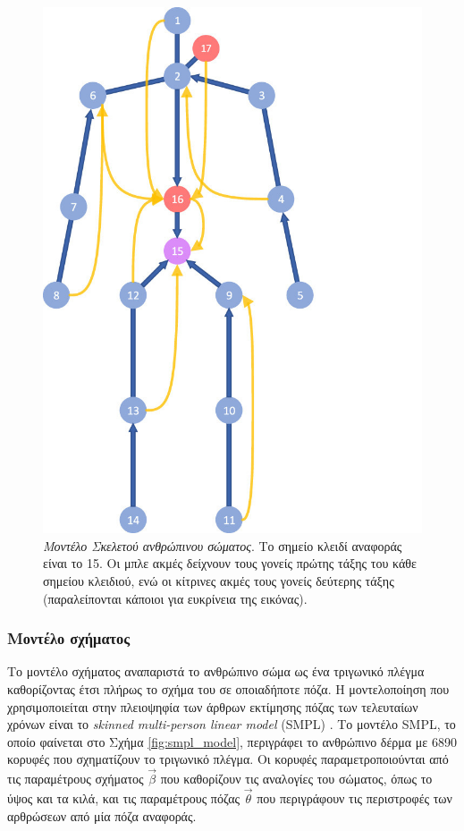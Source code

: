 \begin{figure}[h]
    \centering
    \includegraphics[scale=1.5]{images/chapter2/3d_pose_estimation/skeleton_human_model.jpg}
    \caption[Μοντέλο Σκελετού]{\textsl{Μοντέλο Σκελετού ανθρώπινου σώματος}. Το σημείο κλειδί αναφοράς είναι το 15. Οι μπλε ακμές δείχνουν τους γονείς πρώτης τάξης του κάθε σημείου κλειδιού, ενώ οι κίτρινες ακμές τους γονείς δεύτερης τάξης (παραλείπονται κάποιοι για ευκρίνεια της εικόνας).}
    \label{fig:skeleton_model}
\end{figure}
    
\subsubsection{Μοντέλο σχήματος}
Το μοντέλο σχήματος αναπαριστά το ανθρώπινο σώμα ως ένα τριγωνικό πλέγμα καθορίζοντας έτσι πλήρως το σχήμα του σε οποιαδήποτε πόζα. Η μοντελοποίηση που χρησιμοποιείται στην πλειοψηφία των άρθρων εκτίμησης πόζας των τελευταίων χρόνων είναι το \textsl{skinned multi-person linear model} (SMPL) \cite{smpl_paper}. Το μοντέλο SMPL, το οποίο φαίνεται στο Σχήμα \ref{fig:smpl_model}, περιγράφει το ανθρώπινο δέρμα με 6890 κορυφές που σχηματίζουν το τριγωνικό πλέγμα. Οι κορυφές παραμετροποιούνται από τις παραμέτρους σχήματος $\vec{\beta}$ που καθορίζουν τις αναλογίες του σώματος, όπως το ύψος και τα κιλά, και τις παραμέτρους πόζας $\vec{\theta}$ που περιγράφουν τις περιστροφές των αρθρώσεων από μία πόζα αναφοράς.
    
